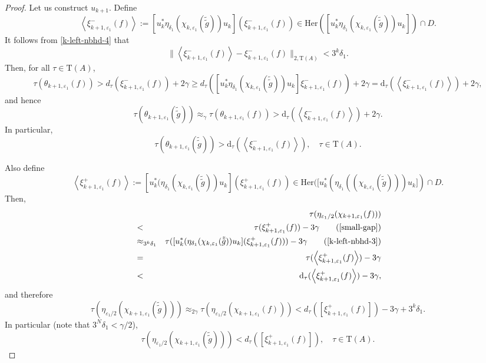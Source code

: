\documentclass[12pt, oneside, psamsfonts]{amsart}
\theoremstyle{definition}
\theoremstyle{remark}
\numberwithin{equation}{section}
\newcommand{\norm}[1]{\| #1\|}
\newcommand{\eps}{\varepsilon}
\newcommand{\tr}{\mathrm{T}}
\begin{document}
\begin{proof}
Let us construct $u_{k+1}$.
Define
$$\left< \xi^-_{k+1, \eps_1}(f) \right> := [u^*_k\eta_{\delta_1}(\chi_{k, \eps_1}(\tilde{\tilde{g}}))u_k] (\xi^-_{k+1, \eps_1}(f)) \in \mathrm{Her}([u_k^* \eta_{\delta_1}(\chi_{k, \eps_1}(\tilde{\tilde{g}}))u_k] ) \cap D.$$
It follows from \eqref{k-left-nbhd-4} that
\begin{equation}\label{k-Xi-cut}
 \norm{\left< \xi^-_{k+1, \eps_1}(f) \right> - \xi^-_{k+1, \eps_1}(f)}_{2, \tr(A)} < 3^k\delta_1.  
 \end{equation}
Then, for all $\tau \in \tr(A)$, 
$$ \tau(\theta_{k+1, \eps_1}(f)) > d_\tau(\xi^-_{k+1, \eps_1}(f)) + 2 \gamma \geq d_\tau([u^*_k\eta_{\delta_1}(\chi_{k, \eps_1}(\tilde{\tilde{g}}))u_k]\xi^-_{k+1, \eps_1}(f)) + 2 \gamma  = \mathrm{d}_\tau(\left< \xi^-_{k+1, \eps_1}(f) \right>) + 2\gamma,$$
and hence 
$$\tau(\theta_{k+1, \eps_1}(\tilde{\tilde{g}})) \approx_{\gamma} \tau(\theta_{k+1, \eps_1}(f)) > \mathrm{d}_\tau( \left< \xi_{k+1, \eps_1}^-(f) \right>) + 2 \gamma. $$ 
In particular,
\begin{equation}\label{k-lem-cond-2}
\tau(\theta_{k+1, \eps_1}(\tilde{\tilde{g}})) >  \mathrm{d}_\tau( \left< \xi_{k+1, \eps_1}^-(f) \right> ),\quad \tau \in \tr(A). 
\end{equation}

Also define 
\begin{equation}\label{k+1-Xi-+}
\left< \xi^+_{k+1, \eps_1}(f) \right> := [u_k^*(\eta_{\delta_1}(\chi_{k, \eps_1}(\tilde{\tilde{g}}))u_k] (\xi^+_{k+1, \eps_1}(f)) \in \mathrm{Her}([u_k^*(\eta_{\delta_1}((\chi_{k, \eps_1}(\tilde{\tilde{g}})))u_k] ) \cap D.
\end{equation}
Then,
\begin{eqnarray*}
&& \tau(\eta_{\eps_1/2}(\chi_{k+1, \eps_1}( f )) ) \\
& < & \tau(\xi_{k+1, \eps_1}^+(f)) - 3 \gamma \quad \quad (\eqref{small-gap})\\
& \approx_{3^k\delta_1} & \tau( [u_k^*(\eta_{\delta_1}(\chi_{k, \eps_1}(\tilde{\tilde{g}}))u_k] (\xi^+_{k+1, \eps_1}(f)) ) - 3 \gamma \quad\quad (\eqref{k-left-nbhd-3}) \\
&= & \tau(  \left< \xi^+_{k+1, \eps_1}(f) \right> ) - 3 \gamma \\
& < & \mathrm{d}_\tau( \left< \xi^+_{k+1, \eps_1}(f) \right> ) - 3 \gamma, 
\end{eqnarray*}
and therefore
$$ \tau(\eta_{\eps_1/2}(\chi_{k+1, \eps_1}(\tilde{\tilde{g}}))) \approx_{2\gamma} \tau(\eta_{\eps_1/2}(\chi_{k+1, \eps_1}( f )) )  < d_\tau( [\xi^+_{k+1, \eps_1}(f)]) - 3 \gamma+ 3^k\delta_1.$$
In particular  (note that $3^N\delta_1 < \gamma /2$), 
\begin{equation}\label{k-lem-cond-3}
\tau(\eta_{\eps_1/2}(\chi_{k+1, \eps_1}(\tilde{\tilde{g}}))) < d_\tau( [\xi^+_{k+1, \eps_1}(f)]),\quad \tau \in\tr(A).
\end{equation}


\end{proof}
\end{document}
